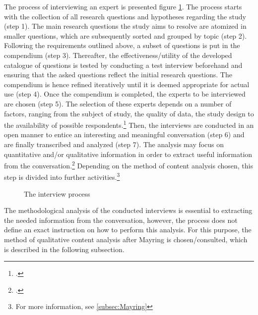 The process of interviewing an expert is presented figure \ref{fig:InterviewProcess}. The process starts with the collection of all research questions and hypotheses regarding the study (step 1). The main research questions the study aims to resolve are atomized in smaller questions, which are subsequently sorted and grouped by topic (step 2). Following the requirements outlined above, a subset of questions is put in the compendium (step 3). Thereafter, the effectiveness/utility of the developed catalogue of questions is tested by conducting a test interview beforehand and ensuring that the asked questions reflect the initial research questions. The compendium is hence refined iteratively until it is deemed appropriate for actual use (step 4). Once the compendium is completed, the experts to be interviewed are chosen (step 5). The selection of these experts depends on a number of factors, ranging from the subject of study, the quality of data, the study design to the availability of possible respondents.\footcites[Cf.][p.134]{KrugerqualitativeInhaltsanalyseMethode2004}[cf.][p.1 et seq.]{MorseDeterminingsamplesize2000}[cf.][p.137]{Flickintroductionqualitativeresearch2009} Then, the interviews are conducted in an open manner to entice an interesting and meaningful conversation (step 6) and are finally transcribed and analyzed (step 7). The analysis may focus on quantitative and/or qualitative information in order to extract useful information from the conversation.\footcites[Cf.][p.37 et seqq]{BognerInterviewsmitExperten2014}[cf.][p.454 et seqq]{MeuserExperteninterviewkonzeptionelleGrundlagen2009}[cf.][p.72]{MasonQualitativeresearching2002} Depending on the method of content analysis chosen, this step is divided into further activities.\footnote{For more information, see \ref{subsec:Mayring}}

\begin{figure}
    \centering
    
    \caption[The interview process]{The interview process}
    \label{fig:InterviewProcess}
\end{figure}

The methodological analysis of the conducted interviews is essential to extracting the needed information from the conversation, however, the process does not define an exact instruction on how to perform this analysis. For this purpose, the method of qualitative content analysis after Mayring is chosen/consulted, which is described in the following subsection.


